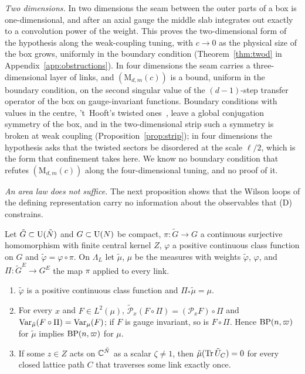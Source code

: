 \emph{Two dimensions.} In two dimensions the seam between the outer parts
of a box is one-dimensional, and after an axial gauge the middle slab
integrates out exactly to a convolution power of the weight. This proves the
two-dimensional form of the hypothesis along the weak-coupling tuning, with
$c\to0$ as the physical size of the box grows, uniformly in the boundary
condition (Theorem~\ref{thm:twod} in Appendix~\ref{app:obstructions}). In
four dimensions the seam carries a three-dimensional layer of links, and
$(\mathrm M_{d,m}(c))$ is a bound, uniform in the boundary condition, on the
second singular value of the $(d-1)$-step transfer operator of the box on
gauge-invariant functions. Boundary conditions with values in the centre,
't~Hooft's twisted ones~\cite{tH79}, leave a global conjugation symmetry of
the box, and in the two-dimensional strip such a symmetry is broken at weak
coupling (Proposition~\ref{prop:strip}); in four dimensions the hypothesis
asks that the twisted sectors be disordered at the scale $\ell/2$, which is
the form that confinement takes here. We know no boundary condition that
refutes $(\mathrm M_{d,m}(c))$ along the four-dimensional tuning, and no
proof of it.

\emph{An area law does not suffice.} The next proposition shows that the
Wilson loops of the defining representation carry no information about the
observables that (D) constrains.

\begin{proposition}\label{prop:cover}
Let $\tilde G\subset\mathrm{U}(\tilde N)$ and $G\subset\mathrm{U}(N)$ be compact,
$\pi:\tilde G\to G$ a continuous surjective homomorphism with finite central
kernel $Z$, $\varphi$ a positive continuous class function on $G$ and
$\tilde\varphi=\varphi\circ\pi$. On $\Lambda_L$ let $\tilde\mu$, $\mu$ be the
measures with weights $\tilde\varphi$, $\varphi$, and $\Pi:\tilde G^E\to G^E$
the map $\pi$ applied to every link.
\begin{enumerate}[label=\textup{(\roman*)},leftmargin=*]
\item $\tilde\varphi$ is a positive continuous class function and
$\Pi_*\tilde\mu=\mu$.
\item For every $x$ and $F\in L^2(\mu)$, $\tilde{\mathcal P}_x(F\circ\Pi)=
(\mathcal P_xF)\circ\Pi$ and $\operatorname{Var}_{\tilde\mu}(F\circ\Pi)=\operatorname{Var}_\mu(F)$; if $F$
is gauge invariant, so is $F\circ\Pi$. Hence $\mathrm{BP}(n,\varpi)$ for $\tilde\mu$
implies $\mathrm{BP}(n,\varpi)$ for $\mu$.
\item If some $z\in Z$ acts on $\mathbb{C}^{\tilde N}$ as a scalar $\zeta\ne1$, then
$\tilde\mu(\operatorname{Tr}\tilde U_C)=0$ for every closed lattice path $C$ that traverses
some link exactly once.
\end{enumerate}
\end{proposition}

